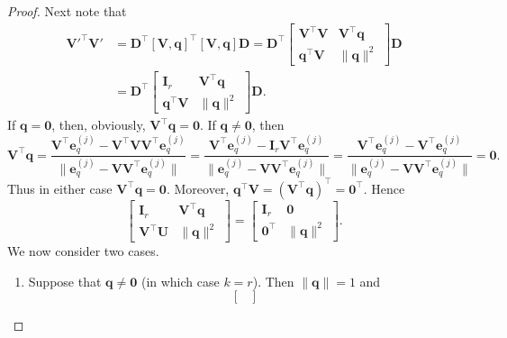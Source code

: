 \documentclass[11pt,a4paper]{article}
\theoremstyle{break}
\numberwithin{dummy}{section}
\theoremstyle{plain}
\theoremstyle{plain}
\theoremstyle{plain}
\theoremstyle{plain}
\theoremstyle{plain}
\theoremstyle{MyNonumberplain}
\newtheorem{proof}{Proof}
\newcommand{\0}{\M{0}}
\newcommand{\M}[1]{\mathbf{#1}}
\newcommand{\T}{\top}
\newcommand{\ve}[1]{\mathbf{#1}}
\newcommand{\eve}[2]{\mathbf{e}^{(#1)}_{#2}}
\begin{document}
\begin{proof}
  Next note that
  \begin{equation}
    \label{eq:33}
    \begin{split}
    \M{V}'^\T \M{V}'
    & =  \M{D}^\T [\M{V}, \ve{q}]^\T [\M{V}, \ve{q}] \M{D} =
    \M{D}^\T
    \begin{bmatrix}
        \M{V}^\T \M{V} & \M{V}^\T \ve{q} \\
        \ve{q}^\T \M{V} & \| \ve{q} \|^2
      \end{bmatrix}
      \M{D}
      \\
      & = \M{D}^\T
      \begin{bmatrix}
        \M{I}_r & \M{V}^\T \ve{q} \\
        \ve{q}^\T \M{V} & \| \ve{q} \|^2
      \end{bmatrix}
      \M{D}.
  \end{split}
\end{equation}
  If $\ve{q} = \0$, then, obviously, $\M{V}^\T \ve{q} = \0$.  If $\ve{q} \neq \0$, then
  \begin{displaymath}
    \M{V}^\T \ve{q}
    =
    \frac{\M{V}^\T\eve{j}{q} - \M{V}^\T\M{V} \M{V}^\T \eve{j}{q}}{\| \eve{j}{q} - \M{V} \M{V}^\T \eve{j}{q}\|}
    =
    \frac{\M{V}^\T\eve{j}{q} - \M{I}_r \M{V}^\T \eve{j}{q}}{\| \eve{j}{q} - \M{V} \M{V}^\T \eve{j}{q}\|}
    =
    \frac{\M{V}^\T\eve{j}{q} - \M{V}^\T \eve{j}{q}}{\| \eve{j}{q} - \M{V} \M{V}^\T \eve{j}{q}\|}
    =
    \0.
  \end{displaymath}
  Thus in either case $\M{V}^\T \ve{q} = \0$. Moreover, $\ve{q}^\T \M{V} = (\M{V}^\T \ve{q})^\T = \0^\T$. Hence
  \begin{displaymath}
    \begin{bmatrix}
      \M{I}_r & \M{V}^\T \ve{q} \\
      \ve{V}^\T \M{U} & \| \ve{q} \|^2
    \end{bmatrix}
    =
    \begin{bmatrix}
      \M{I}_r & \0 \\
      \0^\T& \| \ve{q} \|^2
    \end{bmatrix}.
  \end{displaymath}
  We now consider two cases.
  \begin{enumerate}[font=\upshape,label=(\roman*),wide,align=right]
    \item Suppose that $\ve{q} \neq \0$ (in which case $k = r$). Then $\| \ve{q} \| = 1$ and
    \begin{equation}
      \label{eq:34}
      \begin{bmatrix}

\end{bmatrix}
\end{equation}
\end{enumerate}
\end{proof}
\end{document}
